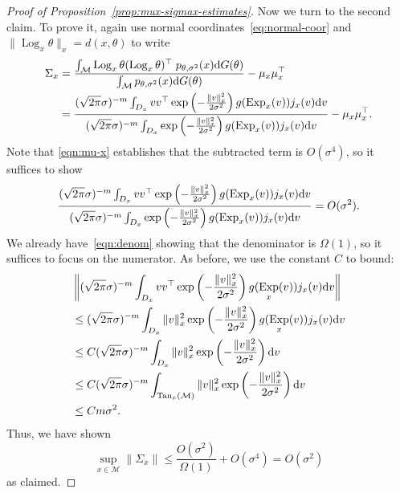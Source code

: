 \documentclass[preprint]{imsart}
\theoremstyle{plain}
\theoremstyle{definition}
\newcommand{\Mcal}{\mathcal{M}}
\newcommand{\diff}{\textnormal{d}}
\DeclareMathOperator{\Tan}{Tan}
\DeclareMathOperator{\Log}{Log}
\DeclareMathOperator{\Exp}{Exp}
\begin{document}
\begin{appendix}
\begin{proof}[Proof of Proposition~\ref{prop:mux-sigmax-estimates}]
    Now we turn to the second claim.
    To prove it, again use normal coordinates~\eqref{eq:normal-coor} and $\|\Log_x\theta\|_x= d(x,\theta)$ to write
   \begin{equation}\label{eqn:sigmax-1}
        \begin{split}
        \Sigma_x &= \frac{\int_{\Mcal}\Log_x\theta(\Log_x\theta)^{\top} \;p_{\theta,\sigma^2}(x)\diff G(\theta)}{\int_{\Mcal} p_{\theta,\sigma^2}(x)\diff G(\theta)} - \mu_x\mu_x^{\top} \\
        &= \frac{(\sqrt{2\pi}\sigma)^{-m}\int_{D_x}vv^{\top} \exp\left(-\frac{\|v\|_x^2}{2\sigma^2}\right)g(\Exp_x(v))j_x(v)\diff v}{(\sqrt{2\pi}\sigma)^{-m}\int_{D_x} \exp\left(-\frac{\|v\|_x^2}{2\sigma^2}\right)g(\Exp_x(v))j_x(v)\diff v} - \mu_x\mu_x^{\top}.
        \end{split}
    \end{equation}
    Note that \eqref{eqn:mu-x} establishes that the subtracted term is $O(\sigma^4)$, so it suffices to show
    \begin{equation*}
        \frac{(\sqrt{2\pi}\sigma)^{-m}\int_{D_x}vv^{\top} \exp\left(-\frac{\|v\|_x^2}{2\sigma^2}\right)g(\Exp_x(v))j_x(v)\diff v}{(\sqrt{2\pi}\sigma)^{-m}\int_{D_x} \exp\left(-\frac{\|v\|_x^2}{2\sigma^2}\right)g(\Exp_x(v))j_x(v)\diff v} = O(\sigma^2).
    \end{equation*}
    We already have~\eqref{eqn:denom} showing that the denominator is $\Omega(1)$, so it suffices to focus on the numerator.
    As before, we use the constant $C$ to bound:
    \begin{equation*}
        \begin{split}
            &\left\|(\sqrt{2\pi}\sigma)^{-m}\int_{D_x}vv^{\top} \exp\left(-\frac{\|v\|_x^2}{2\sigma^2}\right)g(\Exp_x(v))j_x(v)\diff v\right\| \\
            &\le (\sqrt{2\pi}\sigma)^{-m}\int_{D_x}\|v\|_x^2 \exp\left(-\frac{\|v\|_x^2}{2\sigma^2}\right)g(\Exp_x(v))j_x(v)\diff v \\
        &\le C(\sqrt{2\pi}\sigma)^{-m}\int_{D_x}\|v\|_x^2 \exp\left(-\frac{\|v\|_x^2}{2\sigma^2}\right)\diff v \\
        &\le C(\sqrt{2\pi}\sigma)^{-m}\int_{\Tan_x(\Mcal)}\|v\|_x^2 \exp\left(-\frac{\|v\|_x^2}{2\sigma^2}\right)\diff v \\
        &\le Cm\sigma^2.
        \end{split}
    \end{equation*}
    Thus, we have shown
    \begin{equation}\label{eqn:sigma-x}
        \sup_{x\in\Mcal}\|\Sigma_x\| \le \frac{O(\sigma^{2})}{\Omega(1)} + O(\sigma^4)  = O(\sigma^2)
    \end{equation}
    as claimed.
\end{proof}


\end{appendix}
\end{document}
